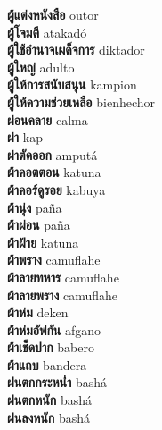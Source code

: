 \textbf{ ผู้แต่งหนังสือ  } outor \\
\textbf{ ผู้โจมตี  } atakadó \\
\textbf{ ผู้ใช้อำนาจเผด็จการ  } diktador \\
\textbf{ ผู้ใหญ่  } adulto \\
\textbf{ ผู้ให้การสนับสนุน  } kampion \\
\textbf{ ผู้ให้ความช่วยเหลือ  } bienhechor \\
\textbf{ ผ่อนคลาย  } calma \\
\textbf{ ผ่า  } kap \\
\textbf{ ผ่าตัดออก  } amputá \\
\textbf{ ผ้าคอตตอน  } katuna \\
\textbf{ ผ้าคอร์ดูรอย  } kabuya \\
\textbf{ ผ้านุ่ง  } paña \\
\textbf{ ผ้าผ่อน  } paña \\
\textbf{ ผ้าฝ้าย  } katuna \\
\textbf{ ผ้าพราง  } camuflahe \\
\textbf{ ผ้าลายทหาร  } camuflahe \\
\textbf{ ผ้าลายพราง  } camuflahe \\
\textbf{ ผ้าห่ม  } deken \\
\textbf{ ผ้าห่มอัฟกัน  } afgano \\
\textbf{ ผ้าเช็ดปาก  } babero \\
\textbf{ ผ้าแถบ  } bandera \\
\textbf{ ฝนตกกระหน่ำ  } bashá \\
\textbf{ ฝนตกหนัก  } bashá \\
\textbf{ ฝนลงหนัก  } bashá \\
